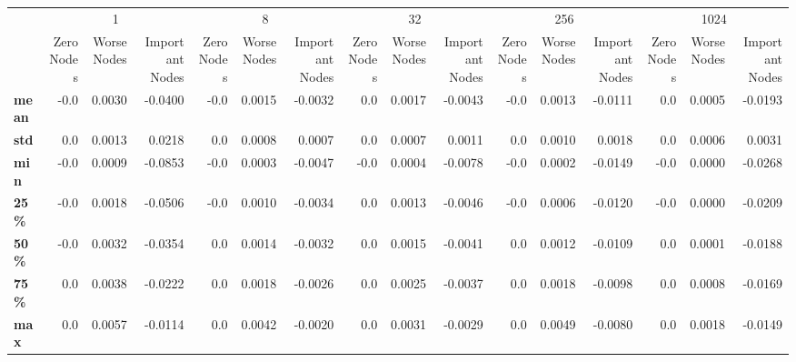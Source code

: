 \begin{tabular}{lrrrrrrrrrrrrrrr}
\toprule
{} & \multicolumn{3}{c}{1} & \multicolumn{3}{c}{8} & \multicolumn{3}{c}{32} & \multicolumn{3}{c}{256} & \multicolumn{3}{c}{1024} \\
{} & Zero Nodes & Worse Nodes & Important Nodes & Zero Nodes & Worse Nodes & Important Nodes & Zero Nodes & Worse Nodes & Important Nodes & Zero Nodes & Worse Nodes & Important Nodes & Zero Nodes & Worse Nodes & Important Nodes \\
\midrule
\textbf{mean} &       -0.0 &      0.0030 &         -0.0400 &       -0.0 &      0.0015 &         -0.0032 &        0.0 &      0.0017 &         -0.0043 &       -0.0 &      0.0013 &         -0.0111 &        0.0 &      0.0005 &         -0.0193 \\
\textbf{std } &        0.0 &      0.0013 &          0.0218 &        0.0 &      0.0008 &          0.0007 &        0.0 &      0.0007 &          0.0011 &        0.0 &      0.0010 &          0.0018 &        0.0 &      0.0006 &          0.0031 \\
\textbf{min } &       -0.0 &      0.0009 &         -0.0853 &       -0.0 &      0.0003 &         -0.0047 &       -0.0 &      0.0004 &         -0.0078 &       -0.0 &      0.0002 &         -0.0149 &       -0.0 &      0.0000 &         -0.0268 \\
\textbf{25\% } &       -0.0 &      0.0018 &         -0.0506 &       -0.0 &      0.0010 &         -0.0034 &        0.0 &      0.0013 &         -0.0046 &       -0.0 &      0.0006 &         -0.0120 &       -0.0 &      0.0000 &         -0.0209 \\
\textbf{50\% } &       -0.0 &      0.0032 &         -0.0354 &        0.0 &      0.0014 &         -0.0032 &        0.0 &      0.0015 &         -0.0041 &        0.0 &      0.0012 &         -0.0109 &        0.0 &      0.0001 &         -0.0188 \\
\textbf{75\% } &        0.0 &      0.0038 &         -0.0222 &        0.0 &      0.0018 &         -0.0026 &        0.0 &      0.0025 &         -0.0037 &        0.0 &      0.0018 &         -0.0098 &        0.0 &      0.0008 &         -0.0169 \\
\textbf{max } &        0.0 &      0.0057 &         -0.0114 &        0.0 &      0.0042 &         -0.0020 &        0.0 &      0.0031 &         -0.0029 &        0.0 &      0.0049 &         -0.0080 &        0.0 &      0.0018 &         -0.0149 \\
\bottomrule
\end{tabular}
